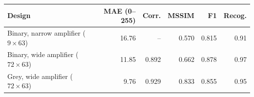 \begin{tabular}{lrrrrr}
\hline
Design & MAE (0--255) & Corr. & MSSIM & F1 & Recog. \\
\hline
Binary, narrow amplifier ($9\times63$) & 16.76 & -- & 0.570 & 0.815 & 0.91 \\
Binary, wide amplifier ($72\times63$) & 11.85 & 0.892 & 0.662 & 0.878 & 0.97 \\
Grey, wide amplifier ($72\times63$) & 9.76 & 0.929 & 0.833 & 0.855 & 0.95 \\
\hline
\end{tabular}
